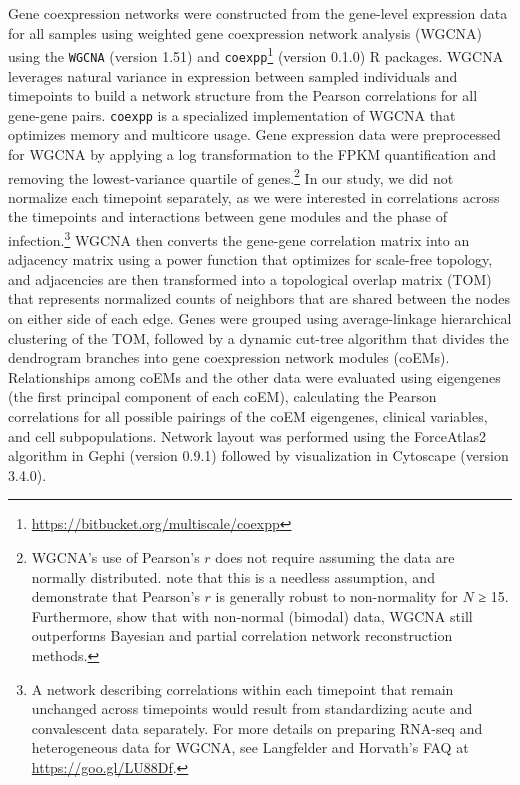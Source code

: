 \begin{sloppypar}
Gene coexpression networks were constructed from the gene-level expression data for all samples using weighted gene coexpression network analysis (WGCNA) using the \texttt{WGCNA}\autocite{Zhang2005} (version 1.51) and \texttt{coexpp}\footnote{\url{https://bitbucket.org/multiscale/coexpp}} (version 0.1.0) R packages. WGCNA leverages natural variance in expression between sampled individuals and timepoints to build a network structure from the Pearson correlations for all gene-gene pairs.\autocite{Zhang2005} \texttt{coexpp} is a specialized implementation of WGCNA that optimizes memory and multicore usage. Gene expression data were preprocessed for WGCNA by applying a log transformation to the FPKM quantification and removing the lowest-variance quartile of genes.\footnote[][-1.5cm]{WGCNA's use of Pearson's $r$ does not require assuming the data are normally distributed. \textcite{Nefzger1957} note that this is a needless assumption, and \textcite{Edgell1984} demonstrate that Pearson's $r$ is generally robust to non-normality for $N$ ≥ 15. Furthermore, \textcite{Allen2012} show that with non-normal (bimodal) data, WGCNA still outperforms Bayesian and partial correlation network reconstruction methods.} In our study, we did not normalize each timepoint separately, as we were interested in correlations across the timepoints and interactions between gene modules and the phase of infection.\footnote{A network describing correlations within each timepoint that remain unchanged across timepoints would result from standardizing acute and convalescent data separately. For more details on preparing RNA-seq and heterogeneous data for WGCNA, see Langfelder and Horvath's FAQ at \url{https://goo.gl/LU88Df}.} WGCNA then converts the gene-gene correlation matrix into an adjacency matrix using a power function that optimizes for scale-free topology, and adjacencies are then transformed into a topological overlap matrix (TOM) that represents normalized counts of neighbors that are shared between the nodes on either side of each edge. Genes were grouped using average-linkage hierarchical clustering of the TOM, followed by a dynamic cut-tree algorithm\autocite{Langfelder2008} that divides the dendrogram branches into gene coexpression network modules (coEMs). Relationships among coEMs and the other data were evaluated using eigengenes\autocite{Langfelder2007} (the first principal component of each coEM), calculating the Pearson correlations for all possible pairings of the coEM eigengenes, clinical variables, and cell subpopulations. Network layout was performed using the ForceAtlas2 algorithm in Gephi\autocite{Bastian2009} (version 0.9.1) followed by visualization in Cytoscape\autocite{Smoot2011} (version 3.4.0).
\end{sloppypar}

